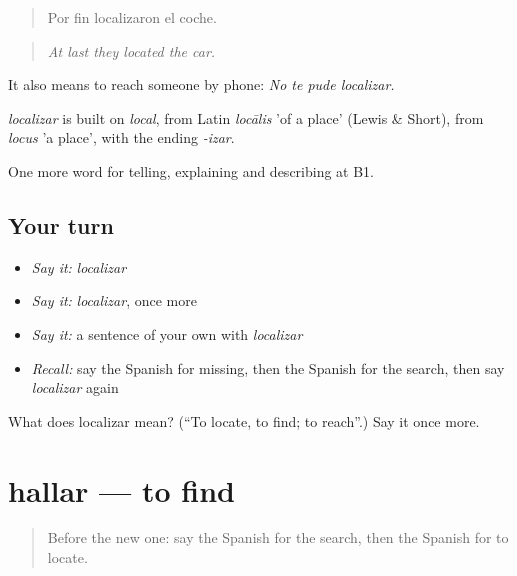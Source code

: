 \begin{quote}
Por fin localizaron el coche.
\end{quote}

\begin{quote}
\emph{At last they located the car.}
\end{quote}

It also means to reach someone by phone: \emph{No te pude localizar.}

\begin{cousinweb}
\emph{localizar} is built on \emph{local}, from Latin \emph{locālis} 'of a place' (Lewis \& Short), from \emph{locus} 'a place', with the ending \emph{-izar}.
\end{cousinweb}

\begin{grammarlens}[title={What you've built}]
One more word for telling, explaining and describing at B1.
\end{grammarlens}

\subsection*{Your turn}
\begin{itemize}
\raggedright
  \item \emph{Say it:} \emph{localizar}
  \item \emph{Say it:} \emph{localizar}, once more
  \item \emph{Say it:} a sentence of your own with \emph{localizar}
  \item \emph{Recall:} say the Spanish for missing, then the Spanish for the search, then say \emph{localizar} again
\end{itemize}

\begin{tcolorbox}[breakable,colback=teal!4,colframe=teal!35!black,title={Before you move on}]
What does localizar mean? (\textquotedblleft{}To locate, to find; to reach\textquotedblright{}.) Say it once more.
\end{tcolorbox}
\section[hallar]{hallar — to find}

\label{lesson:ES-C531-hallar}



\begin{quote}
Before the new one: say the Spanish for the search, then the Spanish for to locate.
\end{quote}

